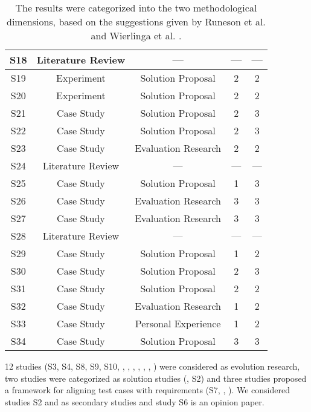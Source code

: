 \documentclass{article}
\begin{document}
\begin{table}[]
\begin{tabular}{c|c|c|c|c}
        \hline
        S18     & Literature Review & --- & --- &  --- \\
        \hline
        S19     & Experiment & Solution Proposal & 2 & 2 \\
        \hline
        S20     & Experiment & Solution Proposal & 2 & 2 \\
        \hline
        S21     & Case Study & Solution Proposal & 2 & 3 \\
        \hline
        S22     & Case Study & Solution Proposal & 2 & 3 \\
        \hline
        S23     & Case Study & Evaluation Research & 2 & 2 \\
        \hline
        S24     & Literature Review & --- & --- & --- \\
        \hline
        S25     & Case Study & Solution Proposal & 1 & 3 \\
        \hline
        S26     & Case Study & Evaluation Research & 3 & 3 \\
        \hline
        S27     & Case Study & Evaluation Research & 3 & 3 \\
        \hline
        S28     & Literature Review & --- & --- & --- \\
        \hline
        S29     & Case Study & Solution Proposal & 1 & 2 \\
        \hline
        S30     & Case Study & Solution Proposal & 2 & 3 \\
        \hline
        S31     & Case Study & Solution Proposal & 2 & 2 \\
        \hline
        S32     & Case Study & Evaluation Research & 1 & 2 \\
        \hline
        S33     & Case Study & Personal Experience & 1 & 2 \\
        \hline
        S34     & Case Study & Solution Proposal & 3 & 3 \\
        \hline
       
       
       
    \end{tabular}
    \caption{The results were categorized into the two methodological dimensions, based on the suggestions given by Runeson et al.\cite{runeson2012case} and Wierlinga et al. \cite{wieringa2006requirements}.}
    \label{tab:TypeRigorRelevance}
\end{table}
 

12 studies (S3, S4, S8, S9, S10, \cite{lobo2005local}, \cite{aichernig2014integration}, \cite{ferguson2006empirical}, \cite{bjarnason2014alignment}, \cite{melnik2006executable}, \cite{bjarnason2013distances}, \cite{melnik2004suitability}) were considered as evolution research, two studies were categorized as solution studies (\cite{ricca2007talkingS20}, S2) and three studies proposed a framework for aligning test cases with requirements (S7, \cite{metsa2007testing}, \cite{bjarnason2015industrialS14}). We considered studies S2 and \cite{ferguson2006empirical} as secondary studies and study S6 is an opinion paper.  
 
\end{document}

